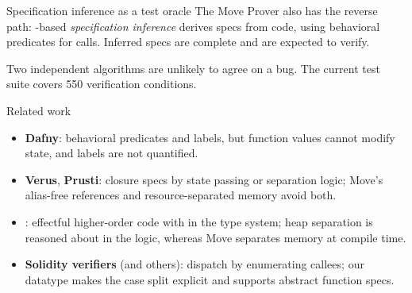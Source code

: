 \documentclass[aspectratio=169,11pt]{beamer}
\begin{document}
\begin{frame}[fragile]{Specification inference as a test oracle}
  The Move Prover also has the reverse path: \WP-based \emph{specification inference} derives specs from code, using behavioral predicates for calls.
  Inferred specs are complete and are expected to verify.
  \medskip

  \centering
  \medskip

  \raggedright
  Two independent algorithms are unlikely to agree on a bug.
  The current test suite covers 550 verification conditions.
\end{frame}

\begin{frame}[fragile]{Related work}
  \begin{itemize}
    \item \textbf{Dafny}: behavioral predicates and labels, but function values cannot modify state, and labels are not quantified.
    \item \textbf{Verus}, \textbf{Prusti}: closure specs by state passing or separation logic; Move's alias-free references and resource-separated memory avoid both.
    \item \textbf{\fstar}: effectful higher-order code with \WP in the type system; heap separation is reasoned about in the logic, whereas Move separates memory at compile time.
    \item \textbf{Solidity verifiers} (\certora and others): dispatch by enumerating callees; our datatype makes the case split explicit and supports abstract function specs.
  \end{itemize}
\end{frame}
\end{document}

